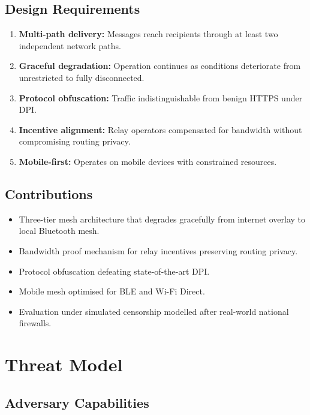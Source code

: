 \documentclass[11pt,a4paper]{article}
\begin{document}
\subsection{Design Requirements}

\begin{enumerate}[label=\textbf{R\arabic*:}]
    \item \textbf{Multi-path delivery:} Messages reach recipients through
    at least two independent network paths.
    \item \textbf{Graceful degradation:} Operation continues as conditions
    deteriorate from unrestricted to fully disconnected.
    \item \textbf{Protocol obfuscation:} Traffic indistinguishable from
    benign HTTPS under DPI.
    \item \textbf{Incentive alignment:} Relay operators compensated for
    bandwidth without compromising routing privacy.
    \item \textbf{Mobile-first:} Operates on mobile devices with
    constrained resources.
\end{enumerate}

\subsection{Contributions}

\begin{itemize}
    \item Three-tier mesh architecture that degrades gracefully from
    internet overlay to local Bluetooth mesh.
    \item Bandwidth proof mechanism for relay incentives preserving
    routing privacy.
    \item Protocol obfuscation defeating state-of-the-art DPI.
    \item Mobile mesh optimised for BLE and Wi-Fi Direct.
    \item Evaluation under simulated censorship modelled after real-world
    national firewalls.
\end{itemize}

\section{Threat Model}
\label{sec:threat}

\subsection{Adversary Capabilities}
\end{document}
